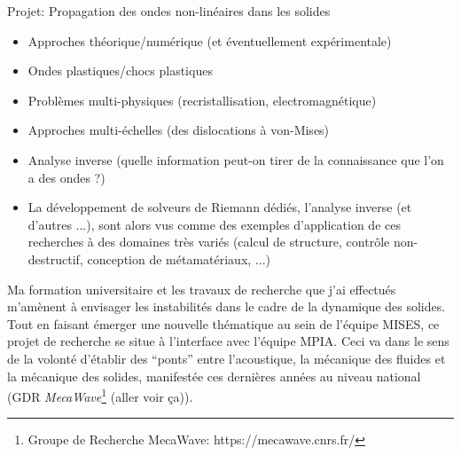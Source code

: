Projet: Propagation des ondes non-linéaires dans les solides
\begin{itemize}
\item Approches théorique/numérique (et éventuellement expérimentale)
\item Ondes plastiques/chocs plastiques
\item Problèmes multi-physiques (recristallisation, electromagnétique)
\item Approches multi-échelles (des dislocations à von-Mises)
\item Analyse inverse (quelle information peut-on tirer de la connaissance que l'on a des ondes ?)
\item La développement de solveurs de Riemann dédiés, l'analyse inverse (et d'autres ...), sont alors vus comme des exemples d'application de ces recherches à des domaines très variés (calcul de structure, contrôle non-destructif, conception de métamatériaux, ...)
\end{itemize}

Ma formation universitaire et les travaux de recherche que j'ai effectués m'amènent à envisager les instabilités dans le cadre de la dynamique des solides.
Tout en faisant émerger une nouvelle thématique au sein de l'équipe MISES, ce projet de recherche se situe à l'interface avec l'équipe MPIA.
Ceci va dans le sens de la volonté d'établir des ``ponts'' entre l'acoustique, la mécanique des fluides et la mécanique des solides, manifestée ces dernières années au niveau national (GDR \textit{MecaWave}\footnote{Groupe de Recherche MecaWave: https://mecawave.cnrs.fr/} (aller voir ça)).

